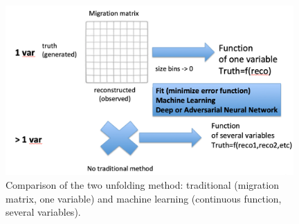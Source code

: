 \begin{figure}[h]
  \centering
  \includegraphics[width=0.98\textwidth]{../presentation/plots/Unfolding_Traditional_ML.png}
  \caption{Comparison of the two unfolding method: traditional (migration matrix, one variable) and machine learning (continuous function, several variables).}
  \label{fig:MigrationMatrix}
\end{figure}
